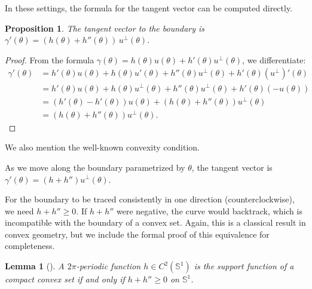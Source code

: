 \documentclass[11pt,letterpaper,reqno]{amsart}
\newcommand{\norm}[1]{\lVert #1\rVert}
\newtheorem{lemma}[theorem]{Lemma}
\newtheorem{proposition}[theorem]{Proposition}
\begin{document}
In these settings, the formula for the tangent vector can be computed directly.

\begin{proposition}
\label{definitiongammaprime}
The tangent vector to the boundary is
\(
\gamma'(\theta) = (h(\theta)+h''(\theta))\,u^\perp(\theta).
\)
\end{proposition}
\begin{explanation}
\begin{proof}
From the formula $\gamma(\theta)=h(\theta)u(\theta)+h'(\theta)u^\perp(\theta)$, we differentiate:
\begin{align*}
\gamma'(\theta)&=h'(\theta)u(\theta)+h(\theta)u'(\theta)+h''(\theta)u^\perp(\theta)+h'(\theta)(u^\perp)'(\theta)\\
&=h'(\theta)u(\theta)+h(\theta)u^\perp(\theta)+h''(\theta)u^\perp(\theta)+h'(\theta)(-u(\theta))\\
&=(h'(\theta)-h'(\theta))u(\theta)+(h(\theta)+h''(\theta))u^\perp(\theta)\\
&=(h(\theta)+h''(\theta))u^\perp(\theta).
\end{align*}
\end{proof}
\end{explanation}
We also mention the well-known convexity condition. 
\begin{explanation}
As we move along the boundary parametrized by $\theta$, the tangent vector is $\gamma'(\theta)=(h+h'')u^\perp(\theta)$.

For the boundary to be traced consistently in one direction (counterclockwise), we need $h+h''\ge 0$.
If $h+h''$ were negative, the curve would backtrack, which is incompatible with the boundary of a convex set. Again, this is a classical result in convex geometry, but we include the formal proof of this equivalence for completeness.
\end{explanation}

\begin{lemma}[\cite{Schneider2014}]
\label{lemmaConvexity}
A $2\pi$-periodic function $h \in C^2( \mathbb S^1)$ is the support function of a compact convex set  if and only if $h+h'' \geq 0$ on $\mathbb{S}^1$.

\end{lemma}
\end{document}
